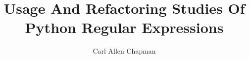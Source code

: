 \title{Usage And Refactoring Studies Of Python Regular Expressions}
\author{Carl Allen Chapman}
\notice
\maketitle

